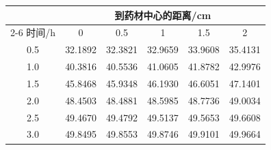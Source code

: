 \begin{tabular}{cccccc}
\toprule
 & \multicolumn{5}{c}{到药材中心的距离/cm} \\
\cmidrule(lr){2-6}
时间/h & 0 & 0.5 & 1 & 1.5 & 2 \\
\midrule
0.5 & 32.1892 & 32.3821 & 32.9659 & 33.9608 & 35.4131 \\
1.0 & 40.3816 & 40.5536 & 41.0605 & 41.8782 & 42.9976 \\
1.5 & 45.8468 & 45.9348 & 46.1930 & 46.6051 & 47.1401 \\
2.0 & 48.4503 & 48.4881 & 48.5985 & 48.7736 & 49.0034 \\
2.5 & 49.4670 & 49.4792 & 49.5137 & 49.5653 & 49.6608 \\
3.0 & 49.8495 & 49.8553 & 49.8746 & 49.9101 & 49.9664 \\
\bottomrule
\end{tabular}
